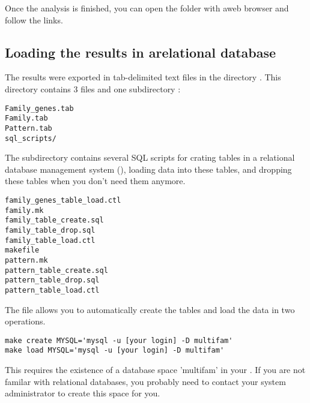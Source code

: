 Once the analysis is finished, you can open the folder
 with aweb browser and follow the links.

\subsection{Loading the results in arelational database}

The results were exported in tab-delimited text files in the directory
. This directory contains 3 files
and one subdirectory :

\begin{verbatim}
Family_genes.tab
Family.tab
Pattern.tab
sql_scripts/
\end{verbatim}

The subdirectory  contains several SQL scripts for crating
tables in a relational database management system (),
loading data into these tables, and dropping these tables when you
don't need them anymore.

\begin{verbatim}
family_genes_table_load.ctl
family.mk
family_table_create.sql
family_table_drop.sql
family_table_load.ctl
makefile
pattern.mk
pattern_table_create.sql
pattern_table_drop.sql
pattern_table_load.ctl
\end{verbatim}

The file  allows you to automatically create the tables
and load the data in two operations.

\begin{verbatim}
make create MYSQL='mysql -u [your login] -D multifam'
make load MYSQL='mysql -u [your login] -D multifam'
\end{verbatim}

This requires the existence of a database space 'multifam' in your
. If you are not familar with relational databases, you
probably need to contact your system administrator to create this
space for you.
